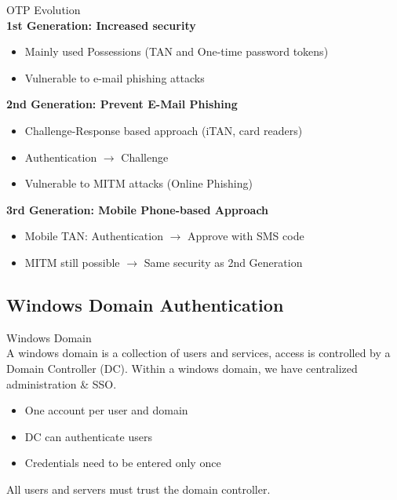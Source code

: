 \begin{concept}{OTP Evolution}\\
    \textbf{1st Generation: Increased security}
    \begin{itemize}
        \item Mainly used Possessions (TAN and One-time password tokens)
        \item Vulnerable to e-mail phishing attacks
    \end{itemize}
    
    \textbf{2nd Generation: Prevent E-Mail Phishing}
    \begin{itemize}
        \item Challenge-Response based approach (iTAN, card readers)
        \item Authentication $\rightarrow$ Challenge
        \item Vulnerable to MITM attacks (Online Phishing)
    \end{itemize}
    
    \textbf{3rd Generation: Mobile Phone-based Approach}
    \begin{itemize}
        \item Mobile TAN: Authentication $\rightarrow$ Approve with SMS code
        \item MITM still possible $\rightarrow$ Same security as 2nd Generation
    \end{itemize}
\end{concept}


\subsection{Windows Domain Authentication}

\begin{definition}{Windows Domain}\\
    A windows domain is a collection of users and services, access is controlled by a Domain Controller (DC). Within a windows domain, we have centralized administration \& SSO.
    \begin{itemize}
        \item One account per user and domain
        \item DC can authenticate users
        \item Credentials need to be entered only once
    \end{itemize}
    
    All users and servers must trust the domain controller.
\end{definition}

